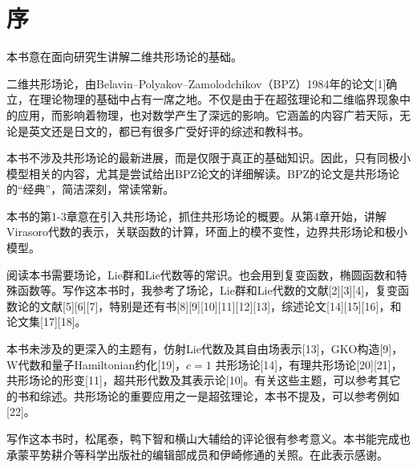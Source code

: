 \chapter*{序}
本书意在面向研究生讲解二维共形场论的基础。

二维共形场论，由Belavin–Polyakov–Zamolodchikov（BPZ）1984年的论文[1]确立，在理论物理的基础中占有一席之地。不仅是由于在超弦理论和二维临界现象中的应用，而影响着物理，也对数学产生了深远的影响。它涵盖的内容广若天际，无论是英文还是日文的，都已有很多广受好评的综述和教科书。

本书不涉及共形场论的最新进展，而是仅限于真正的基础知识。因此，只有同极小模型相关的内容，尤其是尝试给出BPZ论文的详细解读。BPZ的论文是共形场论的“经典”，简洁深刻，常读常新。

本书的第1-3章意在引入共形场论，抓住共形场论的概要。从第4章开始，讲解Virasoro代数的表示，关联函数的计算，环面上的模不变性，边界共形场论和极小模型。

阅读本书需要场论，Lie群和Lie代数等的常识。也会用到复变函数，椭圆函数和特殊函数等。写作这本书时，我参考了场论，Lie群和Lie代数的文献[2][3][4]，复变函数论的文献[5][6][7]，特别是还有书[8][9][10][11][12][13]，综述论文[14][15][16]，和论文集[17][18]。

本书未涉及的更深入的主题有，仿射Lie代数及其自由场表示[13]，GKO构造[9]，W代数和量子Hamiltonian约化[19]，$c=1$ 
共形场论[14]，有理共形场论[20][21]，共形场论的形变[11]，超共形代数及其表示论[10]。有关这些主题，可以参考其它的书和综述。共形场论的重要应用之一是超弦理论，本书不提及，可以参考例如[22]。

写作这本书时，松尾泰，鸭下智和横山大辅给的评论很有参考意义。本书能完成也承蒙平势耕介等科学出版社的编辑部成员和伊崎修通的关照。在此表示感谢。


